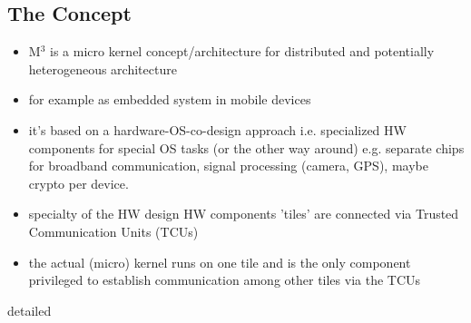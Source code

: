 \subsection{The Concept}
\begin{itemize}
    \item M$^3$ is a micro kernel concept/architecture for distributed and potentially heterogeneous architecture
    \item for example as embedded system in mobile devices
    \item it's based on a hardware-OS-co-design approach i.e. specialized HW components for special OS tasks (or the other way around) e.g. separate chips for broadband communication, signal processing (camera, GPS), maybe crypto per device.
    \item specialty of the HW design \means HW components 'tiles' are connected via Trusted Communication Units (TCUs)
    \item the actual (micro) kernel runs on one tile and is the only component privileged to establish communication among other tiles via the TCUs
\end{itemize}
detailed

